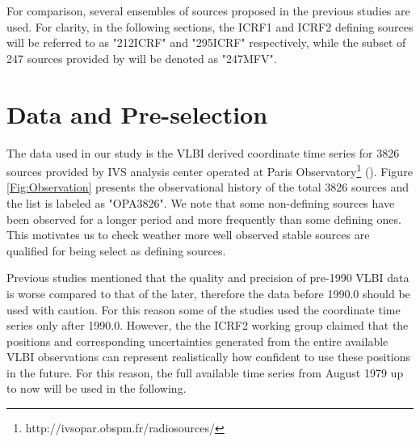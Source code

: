 \documentclass{aa}
\begin{document}
For comparison, several ensembles of sources proposed in the previous studies are used. For clarity, in the following sections, the ICRF1 and ICRF2 defining sources will be referred to as "212ICRF" and "295ICRF" respectively, while the subset of 247 sources provided by \cite{FV2006} will be denoted as "247MFV".
\section{Data and Pre-selection}\label{sect:preselection}
The data used in our study is the VLBI derived coordinate time series for 3826 sources provided by IVS analysis center operated at Paris Observatory\footnote{http://ivsopar.obspm.fr/radiosources/} (\citep[see][Sect.~2 for details]{Lambert2013}).  Figure \ref{Fig:Observation} presents the observational history of the total 3826 sources and the list is labeled as "OPA3826". We note that some non-defining sources have been observed for a longer period and more frequently than some defining ones. This motivates us to check weather more well observed stable sources are qualified for being select as defining sources.

Previous studies \citep[for example]{Lambert2009,AMGontier2001} mentioned that the quality and precision of pre-1990 VLBI data is worse compared to that of the later, therefore the data before 1990.0 should be used with caution. For this reason some of the studies used the coordinate time series only after 1990.0. However, the the ICRF2 working group \citep{IERS2} claimed that the positions and corresponding uncertainties generated from the entire available VLBI observations can represent realistically how confident to use these positions in the future. For this reason, the full available time series from August 1979 up to now will be used in the following.
\end{document}
